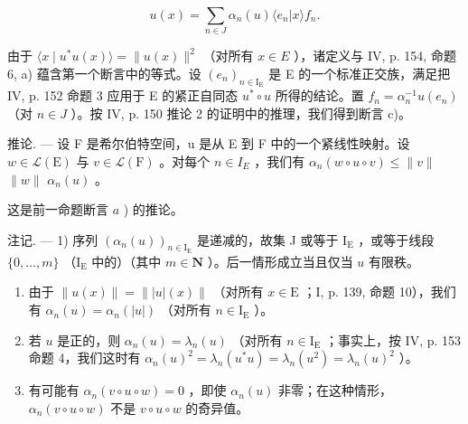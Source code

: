 \[
u (x) = \sum_ {n \in J} \alpha_ {n} (u) \langle e _ {n} | x \rangle f _ {n}.
\]

由于 \(\langle x \mid u^{*}u(x)\rangle = \|u(x)\|^{2}\) （对所有 \(x \in E\) ），诸定义与 IV, p. 154, 命题 6, a) 蕴含第一个断言中的等式。设 \((e_{n})_{n\in\mathrm{I}_{\mathrm{E}}}\) 是 E 的一个标准正交族，满足把 IV, p. 152 命题 3 应用于 E 的紧正自同态 \(u^{*} \circ u\) 所得的结论。置 \(f_{n} = \alpha_{n}^{-1}u(e_{n})\) （对 \(n \in J\) ）。按 IV, p. 150 推论 2 的证明中的推理，我们得到断言 c)。

推论. --- 设 F 是希尔伯特空间，u 是从 E 到 F 中的一个紧线性映射。设 \(w \in \mathcal{L}(\mathrm{E})\) 与 \(v \in \mathcal{L}(\mathrm{F})\) 。对每个 \(n \in I_{E}\) ，我们有 \(\alpha_{n}(w \circ u \circ v) \leqslant \|v\|\) \(\|w\|\) \(\alpha_{n}(u)\) 。

这是前一命题断言 \(a\) ) 的推论。

注记. --- 1) 序列 \((\alpha_{n}(u))_{n\in\mathrm{I}_{\mathrm{E}}}\) 是递减的，故集 J 或等于 \(\mathrm{I}_{\mathrm{E}}\) ，或等于线段 \(\{0,\ldots,m\}\) （\(\mathrm{I}_{\mathrm{E}}\) 中的）（其中 \(m\in\mathbf{N}\) ）。后一情形成立当且仅当 \(u\) 有限秩。

\begin{enumerate}
\def\labelenumi{\arabic{enumi})}
\setcounter{enumi}{1}
\item
  由于 \(\| u(x)\| = \| |u|(x)\|\) （对所有 \(x\in \mathrm{E}\) ；I, p. 139, 命题 10），我们有 \(\alpha_{n}(u) = \alpha_{n}(|u|)\) （对所有 \(n\in \mathrm{I}_{\mathrm{E}}\) ）。
\item
  若 \(u\) 是正的，则 \(\alpha_{n}(u)=\lambda_{n}(u)\) （对所有 \(n\in\mathrm{I}_{\mathrm{E}}\) ；事实上，按 IV, p. 153 命题 4，我们这时有 \(\alpha_{n}(u)^{2}=\lambda_{n}(u^{*}u)=\lambda_{n}(u^{2})=\lambda_{n}(u)^{2}\) ）。
\item
  有可能有 \(\alpha_{n}(v\circ u\circ w)=0\) ，即使 \(\alpha_{n}(u)\) 非零；在这种情形，\(\alpha_{n}(v\circ u\circ w)\) 不是 \(v\circ u\circ w\) 的奇异值。
\end{enumerate}
\relax{}
